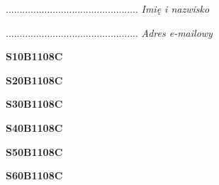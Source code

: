 \begin{turn}{90}\begin{minipage}{\linewidth} \vspace{20mm} ................................................  \textit{Imię i nazwisko}\end{minipage}\end{turn}

\begin{turn}{90}\begin{minipage}{\linewidth} \vspace{20mm} ................................................  \textit{Adres e-mailowy}\end{minipage}\end{turn}

\begin{turn}{90}\huge \begin{minipage}{\linewidth} \vspace{10mm}\textbf{S10B1108C}\end{minipage}\end{turn}

\begin{turn}{90}\huge \begin{minipage}{\linewidth} \vspace{10mm}\textbf{S20B1108C}\end{minipage}\end{turn}

\begin{turn}{90}\huge \begin{minipage}{\linewidth} \vspace{10mm}\textbf{S30B1108C}\end{minipage}\end{turn}

\begin{turn}{90}\huge \begin{minipage}{\linewidth} \vspace{10mm}\textbf{S40B1108C}\end{minipage}\end{turn}

\begin{turn}{90}\huge \begin{minipage}{\linewidth} \vspace{10mm}\textbf{S50B1108C}\end{minipage}\end{turn}

\begin{turn}{90}\huge \begin{minipage}{\linewidth} \vspace{10mm}\textbf{S60B1108C}\end{minipage}\end{turn}

